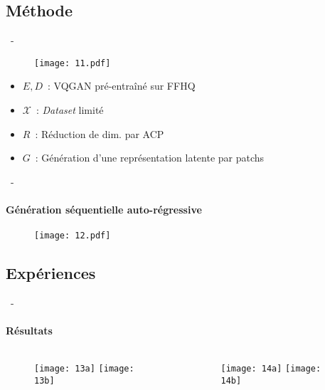 \documentclass[aspectratio=169, 22pt]{beamer}
\begin{document}
\subsection{Méthode}
\begin{frame}{\secname~- \subsecname}
  \begin{figure}
    \texttt{[image: 11.pdf]}
  \end{figure}
  \begin{itemize}
  \item $E, D$ : VQGAN pré-entraîné sur FFHQ
  \item $\mathcal{X}$ : \emph{Dataset} limité
  \item $R$ : Réduction de dim. par ACP
  \item $G$ : Génération d'une représentation latente par patchs
  \end{itemize}
\end{frame}

\begin{frame}{\secname~- \subsecname}
  \framesubtitle{Génération séquentielle auto-régressive}
  \begin{figure}
    \texttt{[image: 12.pdf]}
  \end{figure}
\end{frame}

\subsection{Expériences}
\begin{frame}{\secname~- \subsecname}
  \framesubtitle{Résultats}
  \begin{columns}
    \begin{column}{0.5\linewidth}
      \begin{figure}
        \texttt{[image: 13a]}
        \texttt{[image: 13b]}
      \end{figure}
    \end{column}
    \begin{column}{0.5\linewidth}
      \begin{figure}
        \texttt{[image: 14a]}
        \texttt{[image: 14b]}
      \end{figure}
    \end{column}
  \end{columns}
\end{frame}
\end{document}
